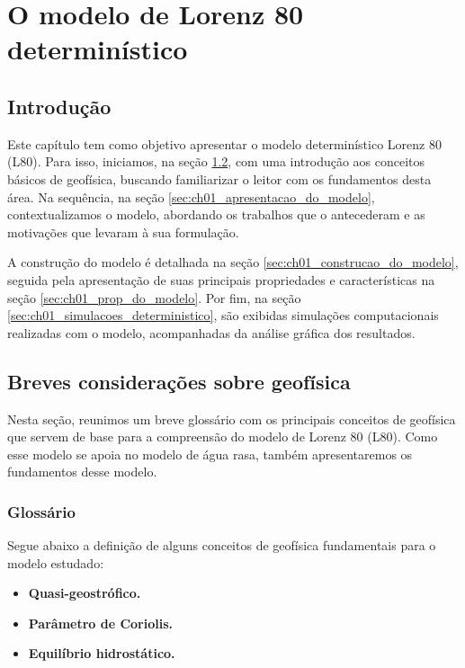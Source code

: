 \chapter{O modelo de Lorenz 80 determinístico} \label{cap:ch01_lorenz_deterministico}

\section{Introdução} \label{sec:ch01_introducao}
Este capítulo tem como objetivo apresentar o modelo determinístico Lorenz 80 (L80). Para isso, iniciamos, na seção \ref{sec:ch01_geofisica}, com uma introdução aos conceitos básicos de geofísica, buscando familiarizar o leitor com os fundamentos desta área. Na sequência, na seção \ref{sec:ch01_apresentacao_do_modelo}, contextualizamos o modelo, abordando os trabalhos que o antecederam e as motivações que levaram à sua formulação.

A construção do modelo é detalhada na seção \ref{sec:ch01_construcao_do_modelo}, seguida pela apresentação de suas principais propriedades e características na seção \ref{sec:ch01_prop_do_modelo}. Por fim, na seção \ref{sec:ch01_simulacoes_deterministico}, são exibidas simulações computacionais realizadas com o modelo, acompanhadas da análise gráfica dos resultados.


\section{Breves considerações sobre geofísica} \label{sec:ch01_geofisica}

Nesta seção, reunimos um breve glossário com os principais conceitos de geofísica que servem de base para a compreensão do modelo de Lorenz 80 (L80). Como esse modelo se apoia no modelo de água rasa, também apresentaremos os fundamentos desse modelo.

\subsection{Glossário} \label{subsec:ch01_glossario}
Segue abaixo a definição de alguns conceitos de geofísica fundamentais para o modelo estudado:
\begin{itemize}
    \item \textbf{Quasi-geostrófico.}
    \item \textbf{Parâmetro de Coriolis.}
    \item \textbf{Equilíbrio hidrostático.}
\end{itemize}


